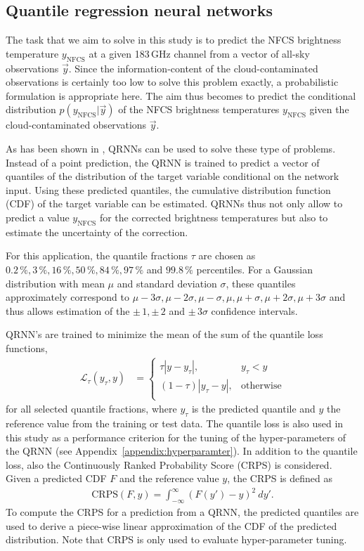 \documentclass[amt, manuscript]{copernicus}
\newcommand{\ynfcs}{y_\text{NFCS}}
\newcommand{\y}{\vec{y}}
\begin{document}
\subsection{Quantile regression neural networks}
\label{sec:QRNN}
%
The task that we aim to solve in this study is to predict the NFCS brightness
temperature $\ynfcs$ at a given 183\,GHz channel from a vector of
all-sky observations $\y$. Since the information-content of the
cloud-contaminated observations is certainly too low to solve this problem
exactly, a probabilistic formulation is appropriate here. The aim thus becomes
to predict the conditional distribution $p(\ynfcs | \y)$ of the NFCS brightness
temperatures $\ynfcs$ given the cloud-contaminated observations $\y$.

As has been shown in \citet{pfreundschuh:aneur:18}, QRNNs can be used to solve
these type of problems. Instead of a point prediction, the QRNN is trained to
predict a vector of quantiles of the distribution of the target variable
conditional on the network input. Using these predicted quantiles, the cumulative
distribution function (CDF) of the target variable can be estimated. QRNNs thus
not only allow to predict a value $\ynfcs$ for the corrected brightness temperatures
but also to estimate the uncertainty of the correction.

For this application, the quantile fractions $\tau$ are chosen as 
$0.2\,\%, 3\,\%, 16\,\%, 50\,\%, 84\,\%, 97\,\%$ and $99.8\,\%$ percentiles. For a Gaussian
distribution with mean $\mu$ and standard deviation $\sigma$, these quantiles
approximately correspond to $\mu -3\sigma, \mu-2\sigma, \mu-\sigma
, \mu, \mu + \sigma, \mu + 2\sigma, \mu + 3\sigma$ and thus allows
estimation of the $\pm\, 1, \pm\, 2$ and $\pm\, 3\sigma$ confidence intervals.

QRNN's are trained to minimize the mean of the sum of the quantile loss functions,
%
\begin{align}
\mathcal{L}_\tau(y_\tau, y) &=
\begin{cases}
\tau|y - y_\tau|, & y_\tau < y \\ (1 - \tau)|y_\tau - y|, & \text{otherwise}
\\
\end{cases}
\end{align}
%
for all selected quantile fractions, where $y_\tau$ is the predicted
quantile and $y$ the reference value from the training or test data. The
quantile loss is also used in this study as a performance criterion for the tuning of
the hyper-parameters of the QRNN (see Appendix~\ref{appendix:hyperparamter}). In
addition to the quantile loss, also the Continuously Ranked Probability Score
(CRPS) is considered. Given a predicted CDF
$F$ and the reference value $y$, the CRPS is defined as
%
\begin{align}
\text{CRPS}(F, y) = \int_{-\infty}^{\infty} \left (F(y') - y\right )^2\: dy'.
\end{align}
%
To compute the CRPS for a prediction from a QRNN, the predicted quantiles are
used to derive a piece-wise linear approximation of the CDF of the predicted
distribution. Note that CRPS is only used to evaluate hyper-parameter tuning.
\end{document}
